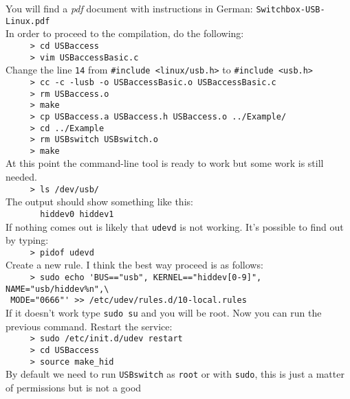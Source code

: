 \begin{enumerate}
You will find a \emph{pdf} document with instructions in German: \verb=Switchbox-USB-Linux.pdf=\\
In order to proceed to the compilation, do the following:\\
\verb=     > cd USBaccess=\\
\verb=     > vim USBaccessBasic.c=\\
Change the line \verb=14= from \verb=#include <linux/usb.h>= to \verb=#include <usb.h>=\\
\verb=     > cc -c -lusb -o USBaccessBasic.o USBaccessBasic.c=\\
\verb=     > rm USBaccess.o=\\
\verb=     > make=\\
\verb=     > cp USBaccess.a USBaccess.h USBaccess.o ../Example/=\\
\verb=     > cd ../Example=\\
\verb=     > rm USBswitch USBswitch.o=\\
\verb=     > make=\\
At this point the command-line tool is ready to work but some work is still needed.\\
\verb=     > ls /dev/usb/=\\
The output should show something like this:\\
\verb=       hiddev0 hiddev1=\\
If nothing comes out is likely that \verb=udevd= is not working. It's possible to find out by typing:\\
\verb=     > pidof udevd=\\
Create a new rule. I think the best way proceed is as follows:\\
\verb#     > sudo echo 'BUS=="usb", KERNEL=="hiddev[0-9]", NAME="usb/hiddev%n",\#\\ 
\verb# MODE="0666"' >> /etc/udev/rules.d/10-local.rules#\\
If it doesn't work type \verb=sudo su= and you will be root. Now you can run the previous command.
Restart the service:\\
\verb=     > sudo /etc/init.d/udev restart=\\
\verb=     > cd USBaccess=\\
\verb=     > source make_hid=\\
By default we need to run \verb=USBswitch= as \verb=root= or with \verb=sudo=, this is just a matter of permissions but is not a good

\end{enumerate}
